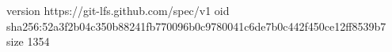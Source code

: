 version https://git-lfs.github.com/spec/v1
oid sha256:52a3f2b04c350b88241fb770096b0c9780041c6de7b0c442f450ce12ff8539b7
size 1354

